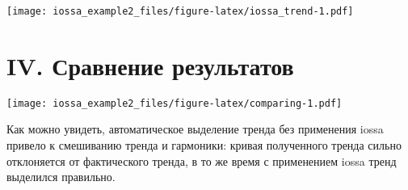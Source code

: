 \documentclass[
]{article}
\newenvironment{Shaded}{\begin{snugshade}}{\end{snugshade}}
\newcommand{\AttributeTok}[1]{\textcolor[rgb]{0.77,0.63,0.00}{#1}}
\newcommand{\DecValTok}[1]{\textcolor[rgb]{0.00,0.00,0.81}{#1}}
\newcommand{\FunctionTok}[1]{\textcolor[rgb]{0.00,0.00,0.00}{#1}}
\newcommand{\NormalTok}[1]{#1}
\newcommand{\OtherTok}[1]{\textcolor[rgb]{0.56,0.35,0.01}{#1}}
\newcommand{\SpecialCharTok}[1]{\textcolor[rgb]{0.00,0.00,0.00}{#1}}
\newcommand{\StringTok}[1]{\textcolor[rgb]{0.31,0.60,0.02}{#1}}
\begin{document}
\texttt{[image: iossa\_example2\_files/figure-latex/iossa\_trend-1.pdf]}

\hypertarget{iv.-ux441ux440ux430ux432ux43dux435ux43dux438ux435-ux440ux435ux437ux443ux43bux44cux442ux430ux442ux43eux432}{%
\section{IV. Сравнение
результатов}\label{iv.-ux441ux440ux430ux432ux43dux435ux43dux438ux435-ux440ux435ux437ux443ux43bux44cux442ux430ux442ux43eux432}}

\begin{Shaded}
\end{Shaded}

\texttt{[image: iossa\_example2\_files/figure-latex/comparing-1.pdf]}

Как можно увидеть, автоматическое выделение тренда без применения iossa
привело к смешиванию тренда и гармоники: кривая полученного тренда
сильно отклоняется от фактического тренда, в то же время с применением
iossa тренд выделился правильно.
\end{document}
